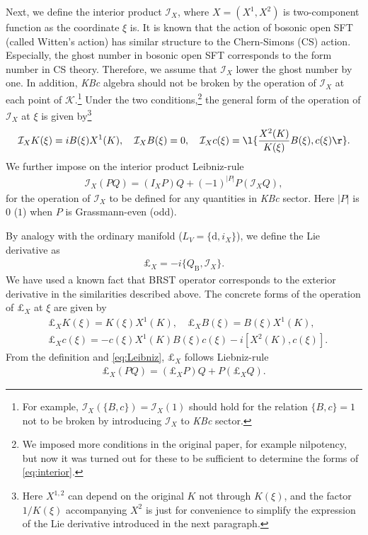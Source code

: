 \documentclass[12pt]{article}
\begin{document}
Next, we define the interior product $\mathcal I_X$, where $X = (X^1,X^2)$ is two-component function as the coordinate $\xi$ is.
It is known that the action of bosonic open SFT (called Witten's action) has similar structure to the Chern-Simons (CS) action.
Especially, the ghost number in bosonic open SFT corresponds to the form number in CS theory.
Therefore, we assume that $\mathcal I_X$ lower the ghost number by one.
In addition, \textit{KBc} algebra should not be broken by the operation of $\mathcal I_X$ at each point of $\mathcal K$.\footnote{
For example, $\mathcal I_X(\{B,c\}) = \mathcal I_X (1)$ should hold for the relation $\{B,c\} = 1$ not to be broken by introducing $\mathcal I_X$ to \textit{KBc} sector.
}
Under the two conditions,\footnote{
We imposed more conditions in the original paper, for example nilpotency, but now it was turned out for these to be sufficient to determine the forms of \eqref{eq:interior}.}
the general form of the operation of $\mathcal I_X$ at $\xi$ is given by\footnote{
Here $X^{1,2}$ can depend on the original $K$ not through $K(\xi)$, and the factor $1/K(\xi)$ accompanying $X^2$ is just for convenience to simplify the expression of the Lie derivative introduced in the next paragraph.
}
\begin{align}
	\mathcal I_X K(\xi)= iB(\xi)X^1(K),\quad
	\mathcal I_X B(\xi) = 0,\quad
	\mathcal I_X c(\xi) = \l\{\frac{X^2(K)}{K(\xi)}B(\xi),c(\xi)\r\}.\label{eq:interior}
\end{align}
We further impose on the interior product Leibniz-rule
\begin{align}
	\mathcal I_X (PQ) = (I_X P)Q + (-1)^{|P|}P(\mathcal I_X Q),\label{eq:Leibniz}
\end{align}
for the operation of $\mathcal I_X$ to be defined for any quantities in \textit{KBc} sector.
Here $|P|$ is $0$ ($1$) when $P$ is Grassmann-even (odd).

By analogy with the ordinary manifold ($L_V = \{\mathrm{d},i_X\}$), we define the Lie derivative as
\begin{align}
	\pounds_X = -i\{Q_\mathrm{B},\mathcal I_X\}.
\end{align}
We have used a known fact that BRST operator corresponds to the exterior derivative in the similarities described above.
The concrete forms of the operation of $\pounds_X$ at $\xi$ are given by
\begin{align}
	&\pounds_X K(\xi) = K(\xi)X^1(K),\quad
	\pounds_X B(\xi) = B(\xi)X^1(K),\nonumber\\
	&\pounds_X c(\xi) = -c(\xi)X^1(K)B(\xi)c(\xi) - i[X^2(K),c(\xi)].
\end{align}
From the definition and  \eqref{eq:Leibniz}, $\pounds_X$ follows Liebniz-rule
\begin{align}
		\pounds_X (PQ) = (\pounds_X P)Q + P(\pounds_X Q).
\end{align}
\end{document}
